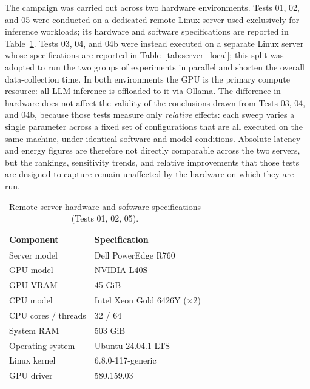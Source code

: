 The campaign was carried out across two hardware environments.
Tests 01, 02, and 05 were conducted on a dedicated remote Linux server used
exclusively for inference workloads; its hardware and software specifications
are reported in Table~\ref{tab:server}. Tests 03, 04, and 04b were instead
executed on a separate Linux server whose specifications are reported in
Table~\ref{tab:server_local}; this split was adopted to run the two groups
of experiments in parallel and shorten the overall data-collection time.
In both environments the GPU is the primary compute resource: all LLM
inference is offloaded to it via Ollama.
The difference in hardware does not affect the validity of the conclusions
drawn from Tests 03, 04, and 04b, because those tests measure only
\emph{relative} effects: each sweep varies a single parameter across a
fixed set of configurations that are all executed on the same machine,
under identical software and model conditions. Absolute latency and energy
figures are therefore not directly comparable across the two servers, but
the rankings, sensitivity trends, and relative improvements that those
tests are designed to capture remain unaffected by the hardware on which
they are run.

\begin{table}[H]
\centering
{}
\begin{tabular}{|l|l|}
\hline
\rowcolor{bluePoli!30}
\textbf{Component} & \textbf{Specification} \T\B \\
\hline
Server model     & Dell PowerEdge R760 \T\B \\
\hline
GPU model        & NVIDIA L40S \T\B \\
\hline
GPU VRAM         & 45 GiB \T\B \\
\hline
CPU model        & Intel Xeon Gold 6426Y (×2) \T\B \\
\hline
CPU cores / threads & 32 / 64 \T\B \\
\hline
System RAM       & 503 GiB \T\B \\
\hline
Operating system & Ubuntu 24.04.1 LTS \T\B \\
\hline
Linux kernel     & 6.8.0-117-generic \T\B \\
\hline
GPU driver       & 580.159.03 \T\B \\
\hline
\end{tabular}
\caption{Remote server hardware and software specifications (Tests 01, 02, 05).}
\label{tab:server}
\end{table}

